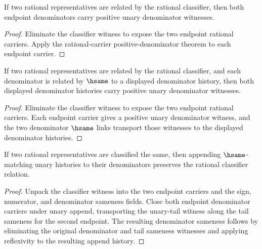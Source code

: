 \begin{theorem}
\label{thm:rat-classifier-positive-denominators}
If two rational representatives are related by the rational classifier, then
both endpoint denominators carry positive unary denominator witnesses.
\end{theorem}
\begin{proof}
Eliminate the classifier witness to expose the two endpoint rational carriers.
Apply the rational-carrier positive-denominator theorem to each endpoint
carrier.
\end{proof}

\begin{theorem}
\label{thm:rat-classifier-denominator-positive-transport}
If two rational representatives are related by the rational classifier, and
each denominator is related by \(\hsame\) to a displayed denominator history,
then both displayed denominator histories carry positive unary denominator
witnesses.
\end{theorem}
\begin{proof}
Eliminate the classifier witness to expose the two endpoint rational carriers.
Each endpoint carrier gives a positive unary denominator witness, and the two
denominator \(\hsame\) links transport those witnesses to the displayed
denominator histories.
\end{proof}

\begin{theorem}
\label{thm:rat-classifier-append-unary-denominators-closed}
If two rational representatives are classified the same, then appending
\(\hsame\)-matching unary histories to their denominators preserves the
rational classifier relation.
\end{theorem}
\begin{proof}
Unpack the classifier witness into the two endpoint carriers and the sign,
numerator, and denominator sameness fields. Close both endpoint denominator
carriers under unary append, transporting the unary-tail witness along the
tail sameness for the second endpoint. The resulting denominator sameness follows by
eliminating the original denominator and tail sameness witnesses and applying
reflexivity to the resulting append history.
\end{proof}

